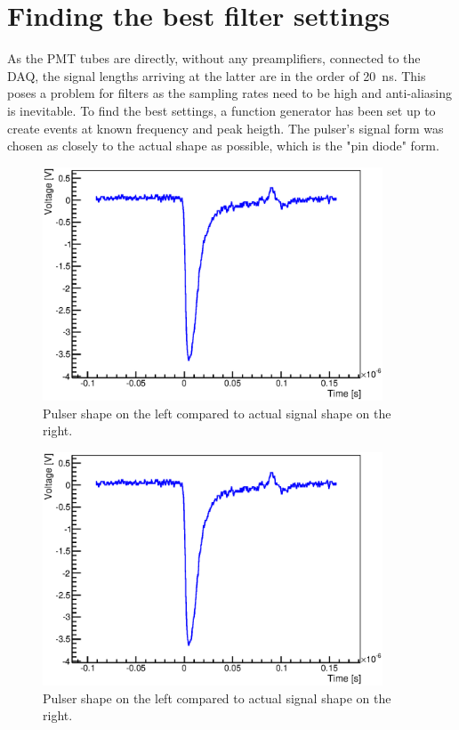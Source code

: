   \section{Finding the best filter settings}
  \label{ch:Analysis:sec:Finding the best filter settings}
  As the PMT tubes are directly, without any preamplifiers, connected to the DAQ, the signal lengths arriving at the latter are in the order of \SI{20}{\nano\second}. This poses a problem for filters as the sampling rates need to be high and anti-aliasing is inevitable. To find the best settings, a function generator has been set up to create events at known frequency and peak heigth. The pulser's signal form  was chosen as closely to the actual shape as possible, which is the "pin diode" form.
 
  \begin{figure}
	\includegraphics[width = 0.9\textwidth]{graphics/muonModules/monSpec/muonSignal.eps}
	\caption[Muon signal shape]{Pulser shape on the left compared to actual signal shape on the right. }
  \end{figure}
	\begin{figure}
	\includegraphics[width = 0.9\textwidth]{graphics/muonModules/monSpec/muonSignal.eps}
	\caption[Pulser and signal shape]{Pulser shape on the left compared to actual signal shape on the right. }
  \end{figure}
  
